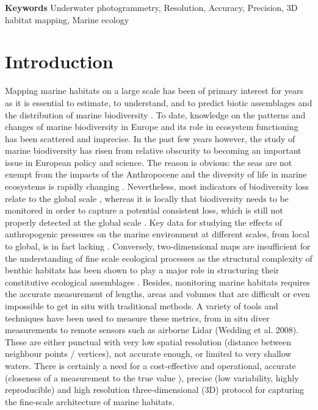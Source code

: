 \medskip
\noindent\textbf{Keywords}
Underwater photogrammetry, Resolution, Accuracy, Precision, 3D habitat mapping, Marine ecology

\section[Introduction]{Introduction}\label{chapitre2_1}
Mapping marine habitats on a large scale has been of primary interest for years as it is essential to estimate, to understand, and to predict biotic assemblages and the distribution of marine biodiversity \citep{tittensor_mid-term_2014}. To date, knowledge on the patterns and changes of marine biodiversity in Europe and its role in ecosystem functioning has been scattered and imprecise. In the past few years however, the study of marine biodiversity has risen from relative obscurity to becoming an important issue in European policy and science. The reason is obvious: the seas are not exempt from the impacts of the Anthropocene and the diversity of life in marine ecosystems is rapidly changing \citep{mcgill_fifteen_2015}. Nevertheless, most indicators of biodiversity loss relate to the global scale \citep{pimm_biodiversity_2014}, whereas it is locally that biodiversity needs to be monitored in order to capture a potential consistent loss, which is still not properly detected at the global scale \citep{dornelas_assemblage_2014}. Key data for studying the effects of anthropogenic pressures on the marine environment at different scales, from local to global, is in fact lacking \citep{halpern_global_2008}. Conversely, two-dimensional maps are insufficient for the understanding of fine scale ecological processes as the structural complexity of benthic habitats has been shown to play a major role in structuring their constitutive ecological assemblages \citep{agudo-adriani_colony_2016, darling_relationships_2017, friedlander_designing_2003, graham_importance_2013, kovalenko_habitat_2012}. Besides, monitoring marine habitats requires the accurate measurement of lengths, areas and volumes that are difficult or even impossible to get in situ with traditional methods. A variety of tools and techniques have been used to measure these metrics, from in situ diver measurements \citep{dustan_digital_2013} to remote sensors such as airborne Lidar (Wedding et al. 2008). These are either punctual with very low spatial resolution (distance between neighbour points / vertices), not accurate enough, or limited to very shallow waters. There is certainly a need for a cost-effective and operational, accurate (closeness of a measurement to the true value \citep{granshaw_photogrammetric_2016}), precise (low variability, highly reproducible) and high resolution three-dimensional (3D) protocol for capturing the fine-scale architecture of marine habitats.


